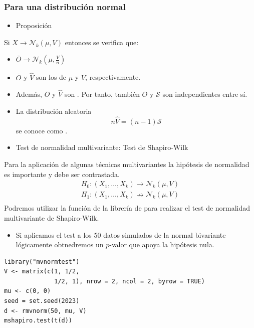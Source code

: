 \subsubsection{Para una distribución normal}
\begin{itemize}[label=\color{red}\textbullet, leftmargin=*]
	\item \color{lightblue}Proposición
\end{itemize}
Si $X\longrightarrow\mathcal{N}_k(\mu,V)$ entonces se verifica que: 
\begin{itemize}
\item $\overline{O}\longrightarrow\mathcal{N}_k\left(\mu,\tfrac{V}{n}\right)$
\item $\overline{O}$ y $\hat{V}$ son los  de $\mu$ y $V$, respectivamente.
\item Además, $\overline{O}$ y $\hat{V}$ son . Por tanto, también $\overline{O}$ y $\mathcal{S}$ son independientes entre sí.
\item La distribución aleatoria \[ n\hat{V}=(n-1)\mathcal{S} \]se conoce como .
\end{itemize}
\begin{itemize}[label=\color{red}\textbullet, leftmargin=*]
	\item \color{lightblue}Test de normalidad multivariante: Test de Shapiro-Wilk
\end{itemize}
Para la aplicación de algunas técnicas multivariantes la hipótesis de normalidad es importante y debe ser contrastada. \[ \begin{array}{l}
H_0:(X_1,\dots,X_k)\rightarrow\mathcal{N}_k(\mu,V)\\
H_1:(X_1,\dots,X_k)\nrightarrow\mathcal{N}_k(\mu,V)\\
\end{array} \]
Podremos utilizar la función  de la librería  de  para realizar el test de normalidad multivariante de Shapiro-Wilk.
\begin{itemize}[label=$\to$]
\item Si aplicamos el test a los 50 datos simulados de la normal bivariante lógicamente obtnedremos un $p$-valor que apoya la hipótesis nula.
\end{itemize}

\begin{lstlisting}
library("mvnormtest")
V <- matrix(c(1, 1/2,
              1/2, 1), nrow = 2, ncol = 2, byrow = TRUE)
mu <- c(0, 0)
seed = set.seed(2023)
d <- rmvnorm(50, mu, V)
mshapiro.test(t(d))
\end{lstlisting}

